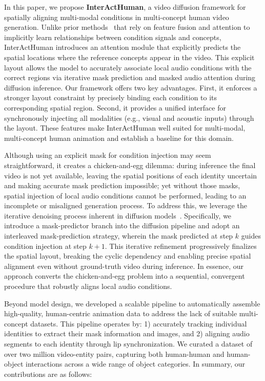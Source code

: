 \documentclass{article} %
\begin{document}
In this paper, we propose \textbf{InterActHuman}, a video diffusion framework for spatially aligning multi-modal conditions in multi-concept human video generation. Unlike prior methods~\citep{chen2025multi,huang2025conceptmaster} that rely on feature fusion and attention to implicitly learn relationships between condition signals and concepts, InterActHuman introduces an attention module that explicitly predicts the spatial locations where the reference concepts appear in the video. This explicit layout allows the model to accurately associate local audio conditions with the correct regions via iterative mask prediction and masked audio attention during diffusion inference. Our framework offers two key advantages. First, it enforces a stronger layout constraint by precisely binding each condition to its corresponding spatial region. Second, it provides a unified interface for synchronously injecting all modalities (e.g., visual and acoustic inputs) through the layout. These features make InterActHuman well suited for multi-modal, multi-concept human animation and establish a baseline for this domain.

Although using an explicit mask for condition injection may seem straightforward, it creates a chicken-and-egg dilemma: during inference the final video is not yet available, leaving the spatial positions of each identity uncertain and making accurate mask prediction impossible; yet without those masks, spatial injection of local audio conditions cannot be performed, leading to an incomplete or misaligned generation process. To address this, we leverage the iterative denoising process inherent in diffusion models~\citep{song2021ddim}. Specifically, we introduce a mask-predictor branch into the diffusion pipeline and adopt an interleaved mask-prediction strategy, wherein the mask predicted at step $k$ guides condition injection at step $k{+}1$. This iterative refinement progressively finalizes the spatial layout, breaking the cyclic dependency and enabling precise spatial alignment even without ground-truth video during inference. In essence, our approach converts the chicken-and-egg problem into a sequential, convergent procedure that robustly aligns local audio conditions.


Beyond model design, we developed a scalable pipeline to automatically assemble high-quality, human-centric animation data to address the lack of suitable multi-concept datasets. This pipeline operates by: 1) accurately tracking individual identities to extract their mask information and images, and 2) aligning audio segments to each identity through lip synchronization. We curated a dataset of over two million video-entity pairs, capturing both human-human and human-object interactions across a wide range of object categories. In summary, our contributions are as follows:
\end{document}
